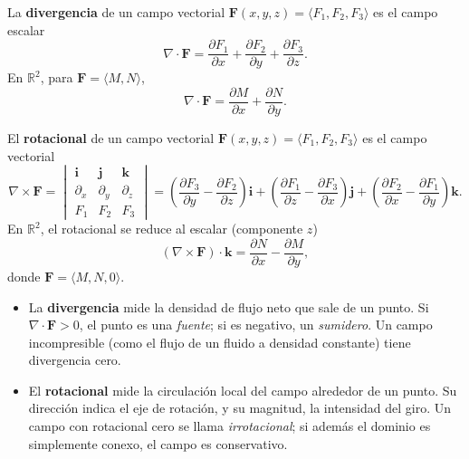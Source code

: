 \begin{definition}[Divergencia]
La \textbf{divergencia} de un campo vectorial $\mathbf{F}(x,y,z) =
\langle F_1, F_2, F_3 \rangle$ es el campo escalar
\[
\nabla \cdot \mathbf{F}
= \frac{\partial F_1}{\partial x}
+ \frac{\partial F_2}{\partial y}
+ \frac{\partial F_3}{\partial z}.
\]
En $\mathbb{R}^2$, para $\mathbf{F} = \langle M, N \rangle$,
\[
\nabla \cdot \mathbf{F} = \frac{\partial M}{\partial x}
+ \frac{\partial N}{\partial y}.
\]
\end{definition}

\begin{definition}[Rotacional]
El \textbf{rotacional} de un campo vectorial $\mathbf{F}(x,y,z) =
\langle F_1, F_2, F_3 \rangle$ es el campo vectorial
\[
\nabla \times \mathbf{F}
= \begin{vmatrix}
\mathbf{i} & \mathbf{j} & \mathbf{k} \\
\partial_x & \partial_y & \partial_z \\
F_1 & F_2 & F_3
\end{vmatrix}
= \left( \frac{\partial F_3}{\partial y} - \frac{\partial F_2}{\partial z} \right)
\mathbf{i}
+ \left( \frac{\partial F_1}{\partial z} - \frac{\partial F_3}{\partial x} \right)
\mathbf{j}
+ \left( \frac{\partial F_2}{\partial x} - \frac{\partial F_1}{\partial y} \right)
\mathbf{k}.
\]
En $\mathbb{R}^2$, el rotacional se reduce al escalar (componente $z$)
\[
(\nabla \times \mathbf{F}) \cdot \mathbf{k}
= \frac{\partial N}{\partial x} - \frac{\partial M}{\partial y},
\]
donde $\mathbf{F} = \langle M, N, 0 \rangle$.
\end{definition}

\begin{rem}
\begin{itemize}
    \item La \textbf{divergencia} mide la densidad de flujo neto que
    sale de un punto. Si $\nabla\cdot\mathbf{F}>0$, el punto es una
    \emph{fuente}; si es negativo, un \emph{sumidero}. Un campo
    incompresible (como el flujo de un fluido a densidad constante)
    tiene divergencia cero.
    \item El \textbf{rotacional} mide la circulación local del campo
    alrededor de un punto. Su dirección indica el eje de rotación, y
    su magnitud, la intensidad del giro. Un campo con rotacional cero
    se llama \emph{irrotacional}; si además el dominio es simplemente
    conexo, el campo es conservativo.
\end{itemize}
\end{rem}

